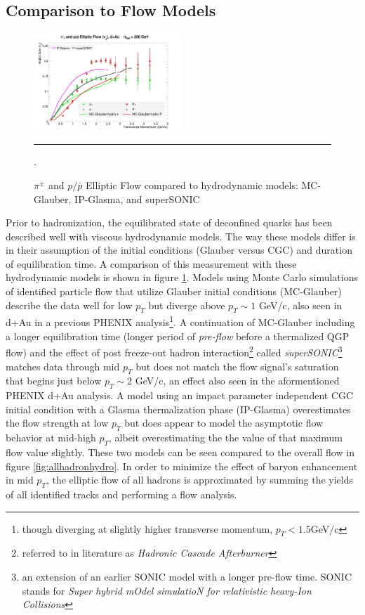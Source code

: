 \subsection{Comparison to Flow Models}
\begin{figure}[hbtp]
\centering    
    \includegraphics[width=0.5\textwidth]{results/v2allpipmodels.jpg}
    \rule{35em}{0.5pt}
    \caption[$\pi^{\pm}$ and $p/\bar{p}$ Elliptic Flow compared to hydrodynamic models.]{$\pi^{\pm}$ and $p/\bar{p}$ Elliptic Flow compared to hydrodynamic models: MC-Glauber\citep{Nagle:2013lja}, IP-Glasma\citep{Schenke:2014gaa}, and superSONIC\citep{Romatschke2015}}.
    \label{fig:hydrov2}
\end{figure}

Prior to hadronization, the equilibrated state of deconfined quarks has been described well with viscous hydrodynamic models. The way these models differ is in their assumption of the initial conditions (Glauber versus CGC) and duration of equilibration time. A comparison of this measurement with these hydrodynamic models is shown in figure \ref{fig:hydrov2}. Models using Monte Carlo simulations of identified particle flow that utilize Glauber initial conditions (MC-Glauber) describe the data well for low $p_T$ but diverge above $p_T \sim 1$ GeV/c, also seen in d+Au in a previous PHENIX analysis\citep{Adare:2014keg}\footnote{though diverging at slightly higher transverse momentum, $p_T < 1.5 $GeV/c}. A continuation of MC-Glauber including a longer equilibration time (longer period of \textit{pre-flow} before a thermalized QGP flow) and the effect of post freeze-out hadron interaction\footnote{referred to in literature as \textit{Hadronic Cascade Afterburner}} called \textit{superSONIC}\citep{Romatschke2015}\footnote{an extension of an earlier SONIC model with a longer pre-flow time. SONIC stands for \textit{Super hybrid mOdel simulatioN for relativistic heavy-Ion Collisions}\citep{Romatschke2015}} matches data through mid $p_T$ but does not match the flow signal's saturation that begins just below $p_T \sim 2$ GeV/c, an effect also seen in the aformentioned PHENIX d+Au analysis. A model using an impact parameter independent CGC initial condition with a Glasma thermalization phase (IP-Glasma)\citep{Schenke:2014gaa} overestimates the flow strength at low $p_T$ but does appear to model the asymptotic flow behavior at mid-high $p_T$, albeit overestimating the the value of that maximum flow value slightly. These two models can be seen compared to the overall flow in figure \ref{fig:allhadronhydro}. In order to minimize the effect of baryon enhancement in mid $p_T$, the elliptic flow of all hadrons is approximated by summing the yields of all identified tracks and performing a flow analysis. 

